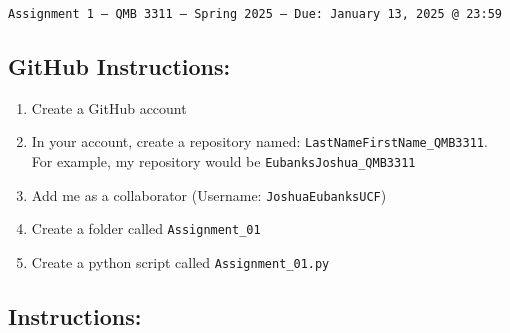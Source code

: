 \documentclass[11pt]{exam}
\begin{document}
\texttt{Assignment 1 --- QMB 3311 ---  Spring 2025  --- Due: January 13, 2025 @ 23:59}


\subsection*{GitHub Instructions:}

\begin{enumerate}
    \item Create a GitHub account
    \item In your account, create a repository named: \texttt{LastNameFirstName\_QMB3311}. For example, my repository would be \texttt{EubanksJoshua\_QMB3311}
    \item Add me as a collaborator (Username: \texttt{JoshuaEubanksUCF})
    \item Create a folder called \texttt{Assignment\_01}
    \item Create a python script called \texttt{Assignment\_01.py}

\end{enumerate}

\subsection*{Instructions:}
\end{document}
